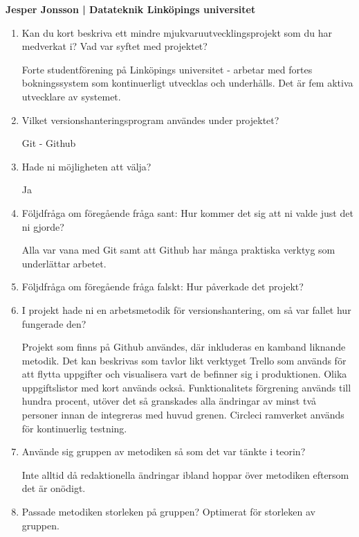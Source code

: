 \clearpage
\begin{center}
    \textbf{Jesper Jonsson | Datateknik Linköpings universitet}
\end{center}
\begin{enumerate}

  \item Kan du kort beskriva ett mindre mjukvaruutvecklingsprojekt som du har medverkat i? Vad var syftet med projektet?

  Forte studentförening på Linköpings universitet - arbetar med fortes bokningssystem som kontinuerligt utvecklas och underhålls. Det är fem aktiva utvecklare av systemet.

  \item Vilket versionshanteringsprogram användes under projektet?

  Git - Github

  \item Hade ni möjligheten att välja?

  Ja

  \item Följdfråga om föregående fråga sant: Hur kommer det sig att ni valde just det ni gjorde?

  Alla var vana med Git samt att Github har många praktiska verktyg som underlättar arbetet.

  \item Följdfråga om föregående fråga falskt: Hur påverkade det projekt?

  \item I projekt hade ni en arbetsmetodik för versionshantering, om så var fallet hur fungerade den?

  Projekt som finns på Github användes, där inkluderas en kamband liknande metodik. Det kan beskrivas som tavlor likt verktyget Trello som används för att flytta uppgifter och visualisera vart de befinner sig i produktionen. Olika uppgiftslistor med kort används också. Funktionalitets förgrening används till hundra procent, utöver det så granskades alla ändringar av minst två personer innan de integreras med huvud grenen. Circleci ramverket används för kontinuerlig testning.

  \item Använde sig gruppen av metodiken så som det var tänkte i teorin?

  Inte alltid då redaktionella ändringar ibland hoppar över metodiken eftersom det är onödigt.

  \item Passade metodiken storleken på gruppen?
  Optimerat för storleken av gruppen.


\end{enumerate}
